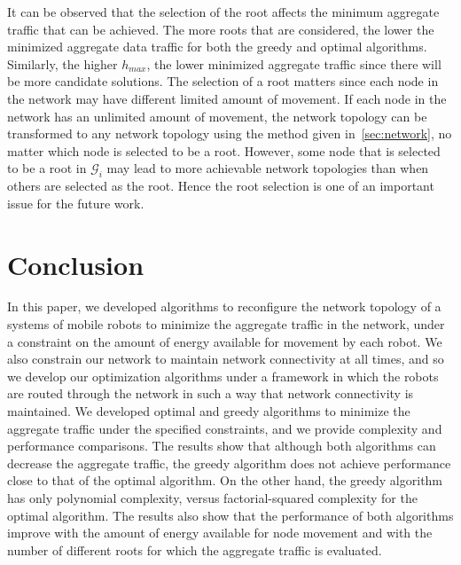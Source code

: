 \documentclass[10pt,conference]{IEEEtran}
\begin{document}
It can be observed that the selection of the root affects the minimum
aggregate traffic that can be achieved. The more roots that are
considered, the lower the minimized aggregate data traffic for both
the greedy and optimal algorithms.  Similarly, the higher $h_{max}$,
the lower minimized aggregate traffic since there will be more
candidate solutions.  The selection of a root matters since each node
in the network may have different limited amount of movement. If each
node in the network has an unlimited amount of movement, the network
topology can be transformed to any network topology using the method
given in~\autoref{sec:network}, no matter which node is selected to be
a root.  However, some node that is selected to be a root in
$\mathcal{G}_{i}$ may lead to more achievable network topologies than
when others are selected as the root. Hence the root selection is one
of an important issue for the future work.




\section{Conclusion}
\label{sec:con}

In this paper, we developed algorithms to reconfigure the network
topology of a systems of mobile robots to minimize the aggregate
traffic in the network, under a constraint on the amount of energy
available for movement by each robot.  We also constrain our network
to maintain network connectivity at all times, and so we develop our
optimization algorithms under a framework in which the robots are
routed through the network in such a way that network connectivity is
maintained.  We developed optimal and greedy algorithms to minimize
the aggregate traffic under the specified constraints, and we provide
complexity and performance comparisons.  The results show that
although both algorithms can decrease the aggregate traffic, the
greedy algorithm does not achieve performance close to that of the
optimal algorithm.  On the other hand, the greedy algorithm has only
polynomial complexity, versus factorial-squared complexity for the
optimal algorithm.  The results also show that the performance of both
algorithms improve with the amount of energy available for node
movement and with the number of different roots for which the
aggregate traffic is evaluated.


\end{document}
